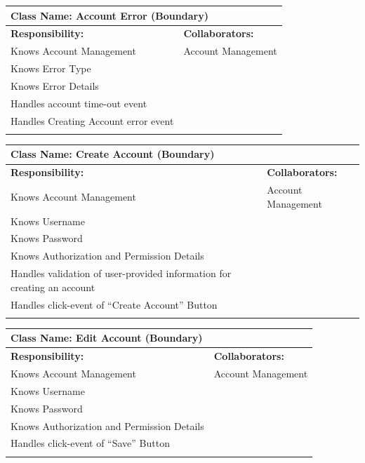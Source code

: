 \documentclass[]{article}
\begin{document}
\begin{itemize}
	\begin{table}[ht]
		\centering
		\begin{tabular}{|p{7cm}|p{7cm}|}
		\hline 
		 \multicolumn{2}{|l|}{\textbf{Class Name:} Account Error (Boundary)} \\
		\hline
		\textbf{Responsibility:} & \textbf{Collaborators:} \\
		\hline
		Knows Account Management & Account Management \\
		Knows Error Type &\\
		Knows Error Details &\\
		Handles account time-out event &\\
		Handles Creating Account error event &\\
		\vspace{0.1in} & \\
		\hline
		\end{tabular}
	\end{table}

	\begin{table}[ht]
		\centering
		\begin{tabular}{|p{7cm}|p{7cm}|}
		\hline 
		 \multicolumn{2}{|l|}{\textbf{Class Name:} Create Account (Boundary)} \\
		\hline
		\textbf{Responsibility:} & \textbf{Collaborators:} \\
		\hline
			Knows Account Management  & Account Management\\
			Knows Username &\\
			Knows Password &\\
			Knows Authorization and Permission Details &\\
			Handles validation of user-provided information for creating an account &\\
			Handles click-event of “Create Account” Button &\\
		\vspace{0.1in} & \\
		\hline
		\end{tabular}
	\end{table}

	\begin{table}[ht]
		\centering
		\begin{tabular}{|p{7cm}|p{7cm}|}
		\hline 
		 \multicolumn{2}{|l|}{\textbf{Class Name:} Edit Account (Boundary)} \\
		\hline
		\textbf{Responsibility:} & \textbf{Collaborators:} \\
		\hline
			Knows Account Management & Account Management\\
			Knows Username &\\
			Knows Password &\\
			Knows Authorization and Permission Details &\\
			Handles click-event of “Save” Button &\\
		\vspace{0.1in} & \\
		\hline
		\end{tabular}
	\end{table}


\end{itemize}
\end{document}
